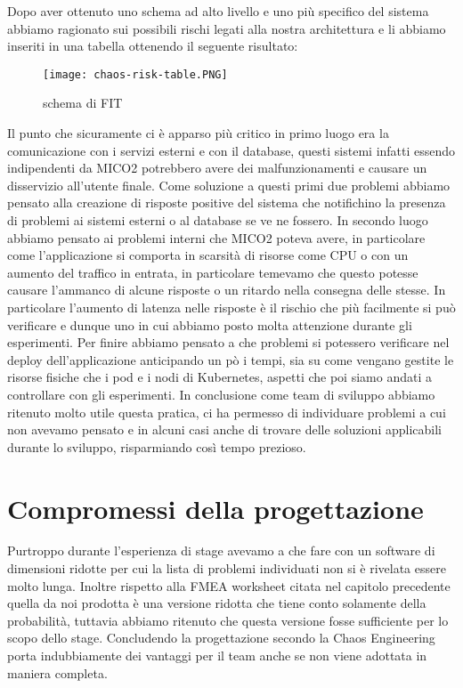 Dopo aver ottenuto uno schema ad alto livello e uno più specifico del sistema abbiamo ragionato sui possibili rischi legati alla nostra architettura e li abbiamo inseriti in una tabella ottenendo il seguente risultato:
\begin{figure}[]
    \centering
    \texttt{[image: chaos-risk-table.PNG]}
    \caption{schema di FIT}
    \label{tab:fitschema}
\end{figure}
Il punto che sicuramente ci è apparso più critico in primo luogo era la comunicazione con i servizi esterni e con il database, questi sistemi infatti essendo indipendenti da MICO2 potrebbero avere dei malfunzionamenti e causare un disservizio all'utente finale.
Come soluzione a questi primi due problemi abbiamo pensato alla creazione di risposte positive del sistema che notifichino la presenza di problemi ai sistemi esterni o al database se ve ne fossero.
In secondo luogo abbiamo pensato ai problemi interni che MICO2 poteva avere, in particolare come l'applicazione si comporta in scarsità di risorse come CPU o con un aumento del traffico in entrata, in particolare temevamo che questo potesse causare l'ammanco di alcune risposte o un ritardo nella consegna delle stesse.
In particolare l'aumento di latenza nelle risposte è il rischio che più facilmente si può verificare e dunque uno in cui abbiamo posto molta attenzione durante gli esperimenti.
Per finire abbiamo pensato a che problemi si potessero verificare nel deploy dell'applicazione anticipando un pò i tempi, sia su come vengano gestite le risorse fisiche che i pod e i nodi di Kubernetes, aspetti che poi siamo andati a controllare con gli esperimenti.
In conclusione come team di sviluppo abbiamo ritenuto molto utile questa pratica, ci ha permesso di individuare problemi a cui non avevamo pensato e in alcuni casi anche di trovare delle soluzioni applicabili durante lo sviluppo, risparmiando così tempo prezioso.

\section{Compromessi della progettazione}
Purtroppo durante l'esperienza di stage avevamo a che fare con un software di dimensioni ridotte per cui la lista di problemi individuati non si è rivelata essere molto lunga.
Inoltre rispetto alla FMEA worksheet citata nel capitolo precedente quella da noi prodotta è una versione ridotta che tiene conto solamente della probabilità, tuttavia abbiamo ritenuto che questa versione fosse sufficiente per lo scopo dello stage.
Concludendo la progettazione secondo la Chaos Engineering porta indubbiamente dei vantaggi per il team anche se non viene adottata in maniera completa.

